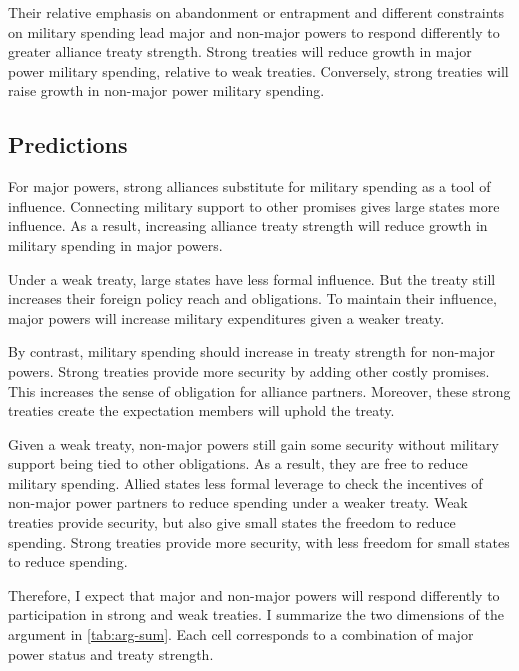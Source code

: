 \documentclass[12pt]{article}
\begin{document}
Their relative emphasis on abandonment or entrapment and different constraints on military spending lead major and non-major powers to respond differently to greater alliance treaty strength. 
Strong treaties will reduce growth in major power military spending, relative to weak treaties. 
Conversely, strong treaties will raise growth in non-major power military spending. 

 


\subsection{Predictions} 

 
For major powers, strong alliances substitute for military spending as a tool of influence. 
Connecting military support to other promises gives large states more influence.
As a result, increasing alliance treaty strength will reduce growth in military spending in major powers. 


Under a weak treaty, large states have less formal influence. 
But the treaty still increases their foreign policy reach and obligations. 
To maintain their influence, major powers will increase military expenditures given a weaker treaty. 


By contrast, military spending should increase in treaty strength for non-major powers. 
Strong treaties provide more security by adding other costly promises. 
This increases the sense of obligation for alliance partners. 
Moreover, these strong treaties create the expectation members will uphold the treaty. 


Given a weak treaty, non-major powers still gain some security without military support being tied to other obligations. 
As a result, they are free to reduce military spending. 
Allied states less formal leverage to check the incentives of non-major power partners to reduce spending under a weaker treaty. 
Weak treaties provide security, but also give small states the freedom to reduce spending. 
Strong treaties provide more security, with less freedom for small states to reduce spending. 


Therefore, I expect that major and non-major powers will respond differently to participation in strong and weak treaties. 
I summarize the two dimensions of the argument in \autoref{tab:arg-sum}. 
Each cell corresponds to a combination of major power status and treaty strength. 
\end{document}
